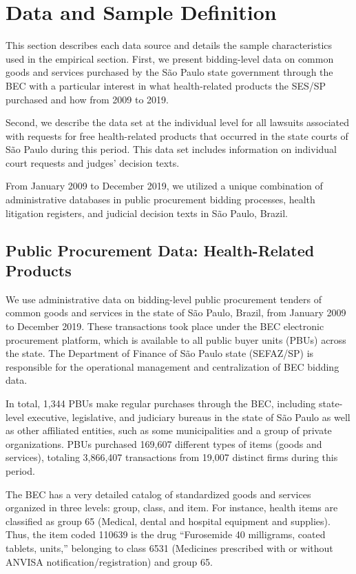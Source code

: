 \section{Data and Sample Definition}
This section describes each data source and details the sample characteristics used in the empirical section. First, we present bidding-level data on common goods and services purchased by the São Paulo state government through the BEC with a particular interest in what health-related products the SES/SP purchased and how from 2009 to 2019.

Second, we describe the data set at the individual level for all lawsuits associated with requests for free health-related products that occurred in the state courts of São Paulo during this period. This data set includes information on individual court requests and judges’ decision texts.

From January 2009 to December 2019, we utilized a unique combination of administrative databases in public procurement bidding processes, health litigation registers, and judicial decision texts in São Paulo, Brazil.

\subsection{Public Procurement Data: Health-Related Products}
We use administrative data on bidding-level public procurement tenders of common goods and services in the state of São Paulo, Brazil, from January 2009 to December 2019. These transactions took place under the BEC electronic procurement platform, which is available to all public buyer units (PBUs) across the state. The Department of Finance of São Paulo state (SEFAZ/SP) is responsible for the operational management and centralization of BEC bidding data.

In total, 1,344 PBUs make regular purchases through the BEC, including state-level executive, legislative, and judiciary bureaus in the state of São Paulo as well as other affiliated entities, such as some municipalities and a group of private organizations. PBUs purchased 169,607 different types of items (goods and services), totaling 3,866,407 transactions from 19,007 distinct firms during this period.

The BEC has a very detailed catalog of standardized goods and services organized in three levels: group, class, and item. For instance, health items are classified as group 65 (Medical, dental and hospital equipment and supplies). Thus, the item coded 110639 is the drug “Furosemide 40 milligrams, coated tablets, units,” belonging to class 6531 (Medicines prescribed with or without ANVISA notification/registration) and group 65.

